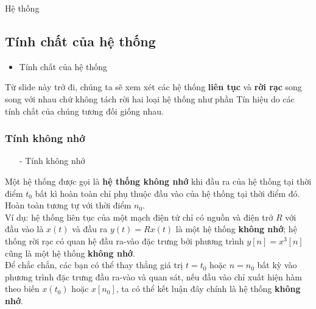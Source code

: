 \documentclass[8pt]{beamer}
\begin{document}
\begin{frame}{Hệ thống}
\subsection{Tính chất của hệ thống}
\begin{itemize}
	\item Tính chất của hệ thống
\end{itemize}
Từ slide này trở đi, chúng ta sẽ xem xét các hệ thống \textbf{liên tục} và \textbf{rời rạc} song song với nhau chứ không tách rời hai loại hệ thống như phần \alert{Tín hiệu} do các tính chất của chúng tương đối giống nhau.
\subsubsection{Tính không nhớ}
\begin{itemize}
	\item[-] Tính không nhớ
\end{itemize}
Một hệ thống được gọi là \textbf{hệ thống không nhớ} khi đầu ra của hệ thống tại thời điểm $t_{0}$ bất kì hoàn toàn chỉ phụ thuộc đầu vào của hệ thống tại thời điểm đó. Hoàn toàn tương tự với thời điểm $n_{0}$.\\ Ví dụ: hệ thống liên tục của một mạch điện tử chỉ có nguồn và điện trở $R$ với đầu vào là $x(t)$ và đầu ra $y(t)=Rx(t)$ là một hệ thống \textbf{không nhớ}; hệ thống rời rạc có quan hệ đầu ra-vào đặc trưng bởi phương trình $y[n]=x^3[n]$ cũng là một hệ thống \textbf{không nhớ}.
\\ Để chắc chắn, các bạn có thể thay thẳng giá trị $t=t_{0}$ hoặc $n=n_{0}$ bất kỳ vào phương trình đặc trưng đầu ra-vào và quan sát, nếu đầu vào chỉ xuất hiện hàm theo biến $x(t_{0})$ hoặc $x[n_{0}]$, ta có thể kết luận đây chính là hệ thống \textbf{không nhớ}.
\end{frame}
\end{document}
